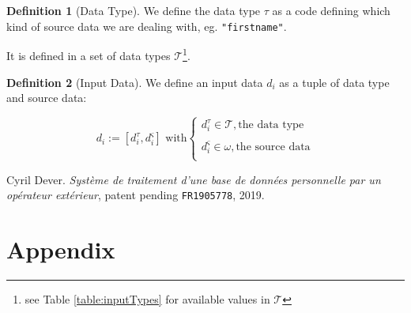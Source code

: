 \documentclass[twoside,twocolumn]{article}
\theoremstyle{definition}
\newtheorem{definition}{Definition}
\theoremstyle{remark}
\begin{document}
\begin{definition}[Data Type]
    \label{dataType}
    We define the data type $\tau$ as a code defining which kind of source data we are dealing with, eg. \texttt{"firstname"}.
    
    It is defined in a set of data types $\mathcal{T}$\footnote{see Table \ref{table:inputTypes} for available values in $\mathcal{T}$}.
\end{definition}

\begin{definition}[Input Data]
    \label{inputData}
    We define an input data $d_i$ as a tuple of data type and source data:
    \begin{small}
        \begin{equation}
            \label{eq:inputData}
                d_i := [d_i^\tau, d_i^\varsigma] \textrm{ with}\left\{
                    \begin{array}{l}
                        d_i^\tau \in \mathcal{T}, \textrm{the data type} \\ \\
                        d_i^\varsigma \in \omega, \textrm{the source data} \\
                    \end{array}
                \right.
        \end{equation}
    \end{small}
\end{definition}



\begin{thebibliography}{99} %

Cyril Dever. \emph{Système de traitement d'une base de données personnelle par un opérateur extérieur}, patent pending \texttt{FR1905778}, 2019.

\end{thebibliography}


\section*{Appendix}
\end{document}
